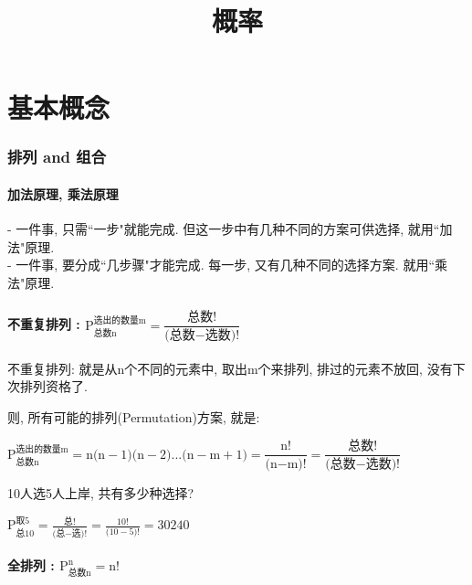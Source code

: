 \documentclass[UTF8]{ctexart}
\title{概率}
\begin{document}
	\tableofcontents %
	\date{} %
	\maketitle  %
	
	\part{基本概念}
	
	
	\section{排列 and 组合}
	
	\subsection{加法原理, 乘法原理}
	
	- 一件事, 只需``一步"就能完成. 但这一步中有几种不同的方案可供选择, 就用``加法"原理. \\	
	- 一件事, 要分成``几步骤"才能完成. 每一步, 又有几种不同的选择方案. 就用``乘法"原理.
	
	
	
	\subsection{不重复排列 : $\text{P}_{\text{总数n}}^{\text{选出的数量m}}=\dfrac{\text{总数!}}{\text{(总数}-\text{选数)!}}		$}
	
	不重复排列: 就是从n个不同的元素中, 取出m个来排列, 排过的元素不放回, 没有下次排列资格了. 
	
	则, 所有可能的排列(Permutation)方案, 就是:	
	
	$
		\boxed{		\text{P}_{\text{总数n}}^{\text{选出的数量m}}=\text{n(n}-1\text{)(n}-2\text{)...(n}-\text{m}+1\text{)}=\dfrac{\text{n!}}{\text{(n}-\text{m)!}}=\dfrac{\text{总数!}}{\text{(总数}-\text{选数)!}} 
		}
	$
	
	\begin{myEnvSample}
		10人选5人上岸, 共有多少种选择?
		
		$
		\text{P}_{\text{总}10}^{\text{取}5}=\frac{\text{总!}}{\text{(总}-\text{选)!}}=\frac{10!}{\text{(}10-5\text{)!}}=30240
		$
	\end{myEnvSample}
	
	
	
	
	
	\subsection{全排列 : $\text{P}_{\text{总数n}}^{\text{n}}=\text{n!}	$ }
	
\end{document}

